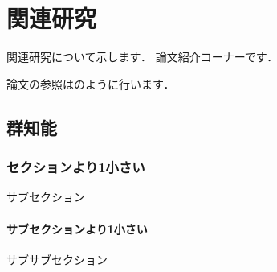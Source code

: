 
\chapter{関連研究}

関連研究について示します．
論文紹介コーナーです．

論文の参照は\cite{bib:bird_swarm}のように行います．

\section{群知能}

\subsection{セクションより1小さい}

サブセクション

\subsubsection{サブセクションより1小さい}

サブサブセクション

